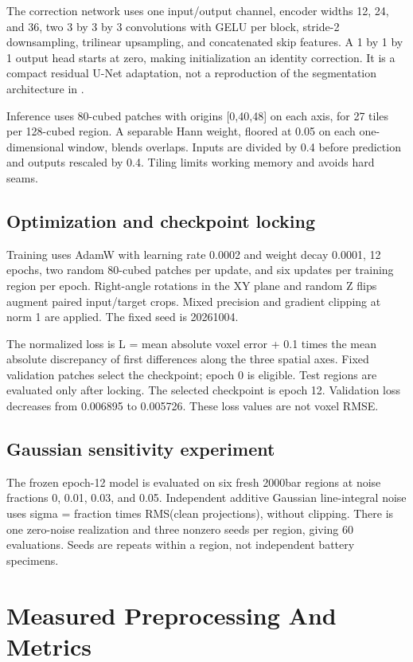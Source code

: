 \documentclass[conference,a4paper]{IEEEtran}
\begin{document}
The correction network uses one input/output channel, encoder widths 12, 24, and 36, two 3 by 3 by 3 convolutions with GELU per block, stride-2 downsampling, trilinear upsampling, and concatenated skip features. A 1 by 1 by 1 output head starts at zero, making initialization an identity correction. It is a compact residual U-Net adaptation, not a reproduction of the segmentation architecture in \cite{ref4}.

Inference uses 80-cubed patches with origins [0,40,48] on each axis, for 27 tiles per 128-cubed region. A separable Hann weight, floored at 0.05 on each one-dimensional window, blends overlaps. Inputs are divided by 0.4 before prediction and outputs rescaled by 0.4. Tiling limits working memory and avoids hard seams.

\subsection{Optimization and checkpoint locking}

Training uses AdamW with learning rate 0.0002 and weight decay 0.0001, 12 epochs, two random 80-cubed patches per update, and six updates per training region per epoch. Right-angle rotations in the XY plane and random Z flips augment paired input/target crops. Mixed precision and gradient clipping at norm 1 are applied. The fixed seed is 20261004.

The normalized loss is L = mean absolute voxel error + 0.1 times the mean absolute discrepancy of first differences along the three spatial axes. Fixed validation patches select the checkpoint; epoch 0 is eligible. Test regions are evaluated only after locking. The selected checkpoint is epoch 12. Validation loss decreases from 0.006895 to 0.005726. These loss values are not voxel RMSE.

\subsection{Gaussian sensitivity experiment}

The frozen epoch-12 model is evaluated on six fresh 2000bar regions at noise fractions 0, 0.01, 0.03, and 0.05. Independent additive Gaussian line-integral noise uses sigma = fraction times RMS(clean projections), without clipping. There is one zero-noise realization and three nonzero seeds per region, giving 60 evaluations. Seeds are repeats within a region, not independent battery specimens.

\section{Measured Preprocessing And Metrics}
\end{document}
